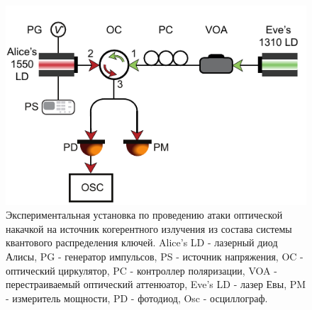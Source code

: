 \begin{figure}
    \centering
    \includegraphics{images/1310 experiment (3).pdf}
    \caption{Экспериментальная установка по проведению атаки оптической накачкой на источник когерентного излучения из состава системы квантового распределения ключей. Alice's LD - лазерный диод Алисы, PG - генератор импульсов, PS - источник напряжения, OC - оптический циркулятор, PC - контроллер поляризации, VOA - перестраиваемый оптический аттенюатор, Eve's LD - лазер Евы, PM - измеритель мощности, PD - фотодиод, Osc - осциллограф.}
    \label{fig:ch4 1310 exp}
\end{figure}
